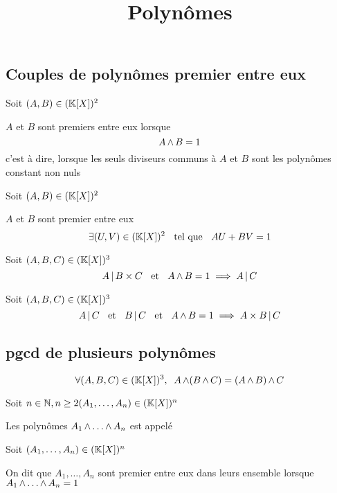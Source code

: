 

\title{Polynômes}




\subsection{Couples de polynômes premier entre eux}

\begin{dfn}
Soit $(A, B) \in (\mathbb{K}[X])^2$

$A$ et $B$ sont premiers entre eux lorsque
\[
    A \operatorname{\wedge} B = 1
\]
c'est à dire, lorsque les seuls diviseurs communs à $A$ et $B$ sont les
polynômes constant non nuls
\end{dfn}

\begin{thm}[Bézout]
Soit $(A, B) \in (\mathbb{K}[X])^2$

$A$ et $B$ sont premier entre eux \ssi
\[
    \exists (U, V) \in (\mathbb{K}[X])^2 \;\;\text{ tel que }\;\; A U + B V = 1
\]
\end{thm}

\begin{thm}
Soit $(A, B, C) \in (\mathbb{K}[X])^3$
\[
    A \operatorname{|} B \times C \;\;\text{ et }\;\; A \operatorname{\wedge} B = 1 \implies A \operatorname{|} C
\]
\end{thm}

\begin{prp}
Soit $(A, B, C) \in (\mathbb{K}[X])^3$
\[
    A \operatorname{|} C \;\;\text{ et }\;\; B \operatorname{|} C \;\;\text{ et }\;\; A \operatorname{\wedge} B = 1 \implies A \times B
    \operatorname{|} C
\]
\end{prp}

\subsection{pgcd de plusieurs polynômes}

\begin{prp}
\[
    \forall (A, B, C) \in (\mathbb{K}[X])^3, \;\;
    A \operatorname{\wedge} (B \operatorname{\wedge} C) = (A \operatorname{\wedge} B) \operatorname{\wedge} C
\]
\end{prp}

\begin{dfn}
Soit $n \in \mathbb{N}, n \geq 2 (A_1, \ldots, A_n) \in (\mathbb{K}[X])^n$

Les polynômes $A_1 \operatorname{\wedge} \ldots \operatorname{\wedge} A_n$ est appelé
\end{dfn}

\begin{dfn}
Soit $(A_1, \ldots, A_n) \in (\mathbb{K}[X])^n$ 

On dit que $A_1, \ldots, A_n$ sont premier entre eux dans leurs
ensemble lorsque $A_1 \operatorname{\wedge} \ldots \operatorname{\wedge} A_n = 1$
\end{dfn}

